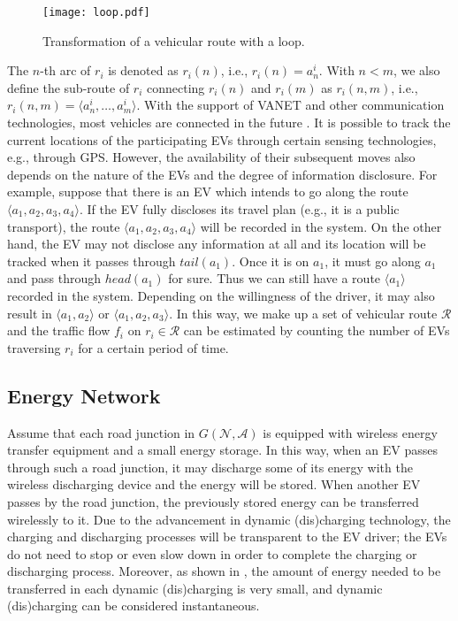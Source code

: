 \documentclass[journal]{IEEEtran}
\begin{document}
\begin{figure}[!t]
\centering
\texttt{[image: loop.pdf]}
\caption{Transformation of a vehicular route with a loop.}
\label{fig:loop}
\end{figure}

The $n$-th arc of $r_i$ is denoted as $r_i(n)$, i.e., $r_i(n)=a^i_n$. With $n<m$, we also define the sub-route of $r_i$ connecting $r_i(n)$ and $r_i(m)$ as $r_i(n,m)$, i.e., $r_i(n,m) = \langle a^i_n,\ldots,a^i_m \rangle$.
With the support of VANET and other communication technologies, most vehicles are connected in the future \cite{connected}. It is possible to track the current locations of the participating EVs through certain sensing technologies, e.g., through GPS. However, the availability of their subsequent moves also depends on the nature of the EVs and the degree of information disclosure. For example, suppose that there is an EV which intends to go along the route $\langle a_1, a_2,a_3,a_4 \rangle$. If the EV fully discloses its travel plan (e.g., it is a public transport), the route $\langle a_1, a_2,a_3,a_4 \rangle$ will be recorded in the system. On the other hand, the EV may not disclose any information at all and its location will be tracked when it passes through $tail(a_1)$. Once it is on $a_1$, it must go along $a_1$ and pass through $head(a_1)$ for sure. Thus we can still have a route $\langle a_1 \rangle$ recorded in the system. Depending on the willingness of the driver, it may also result in $\langle a_1, a_2 \rangle$ or $\langle a_1, a_2,a_3 \rangle$. In this way, we make up a set of vehicular route $\mathcal{R}$ and the traffic flow $f_i$ on $r_i\in \mathcal{R}$ can be estimated by counting the number of EVs traversing $r_i$ for a certain period of time.


\subsection{Energy Network} 

Assume that each road junction in $G(\mathcal{N},\mathcal{A})$ is equipped with wireless energy transfer equipment and a small energy storage. In this way, when an EV passes through such a road junction, it may discharge some of its energy with the wireless discharging device and the energy will be stored. When another EV passes by the road junction, the previously stored energy can be transferred wirelessly to it. Due to the advancement  in dynamic (dis)charging technology, the charging and discharging processes will be transparent to the EV driver; the EVs do not need to stop or even slow down in order to complete the charging or discharging process. Moreover, as shown in \cite{VEN}, the amount of energy needed to be transferred in each dynamic (dis)charging is very small, and dynamic (dis)charging can be considered instantaneous.
\end{document}
